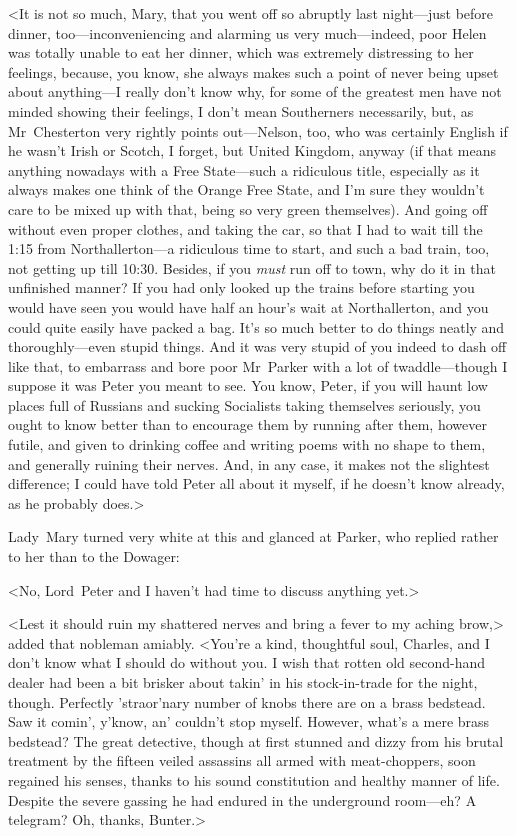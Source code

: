 <It is not so much, Mary, that you went off so abruptly last night—just before dinner, too—inconveniencing and alarming us very much—indeed, poor Helen was totally unable to eat her dinner, which was extremely distressing to her feelings, because, you know, she always makes such a point of never being upset about anything—I really don't know why, for some of the greatest men have not minded showing their feelings, I don't mean Southerners necessarily, but, as Mr~Chesterton very rightly points out—Nelson, too, who was certainly English if he wasn't Irish or Scotch, I forget, but United Kingdom, anyway (if that means anything nowadays with a Free State—such a ridiculous title, especially as it always makes one think of the Orange Free State, and I'm sure they wouldn't care to be mixed up with that, being so very green themselves). And going off without even proper clothes, and taking the car, so that I had to wait till the 1:15 from Northallerton—a ridiculous time to start, and such a bad train, too, not getting up till 10:30. Besides, if you \emph{must} run off to town, why do it in that unfinished manner? If you had only looked up the trains before starting you would have seen you would have half an hour's wait at Northallerton, and you could quite easily have packed a bag.  It's so much better to do things neatly and thoroughly—even stupid things. And it was very stupid of you indeed to dash off like that, to embarrass and bore poor Mr~Parker with a lot of twaddle—though I suppose it was Peter you meant to see. You know, Peter, if you will haunt low places full of Russians and sucking Socialists taking themselves seriously, you ought to know better than to encourage them by running after them, however futile, and given to drinking coffee and writing poems with no shape to them, and generally ruining their nerves. And, in any case, it makes not the slightest difference; I could have told Peter all about it myself, if he doesn't know already, as he probably does.>

Lady~Mary turned very white at this and glanced at Parker, who replied rather to her than to the Dowager:

<No, Lord~Peter and I haven't had time to discuss anything yet.>

<Lest it should ruin my shattered nerves and bring a fever to my aching brow,> added that nobleman amiably. <You're a kind, thoughtful soul, Charles, and I don't know what I should do without you. I wish that rotten old second-hand dealer had been a bit brisker about takin' in his stock-in-trade for the night, though. Perfectly 'straor'nary number of knobs there are on a brass bedstead. Saw it comin', y'know, an' couldn't stop myself. However, what's a mere brass bedstead? The great detective, though at first stunned and dizzy from his brutal treatment by the fifteen veiled assassins all armed with meat-choppers, soon regained his senses, thanks to his sound constitution and healthy manner of life. Despite the severe gassing he had endured in the underground room—eh? A telegram? Oh, thanks, Bunter.>

